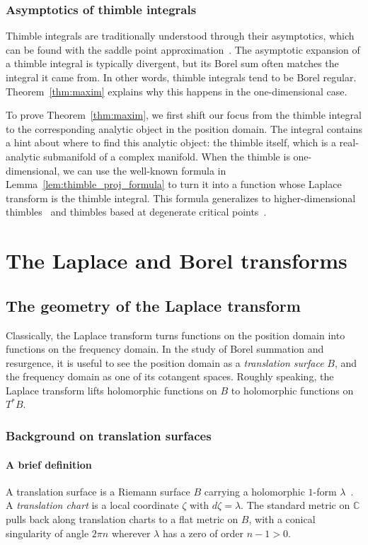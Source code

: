 \documentclass{article}
\newcommand{\C}{\mathbb{C}}
\theoremstyle{definition}
\theoremstyle{plain}
\begin{document}
\subsubsection{Asymptotics of thimble integrals}
%
Thimble integrals are traditionally understood through their asymptotics, which can be found with the saddle point approximation~\cite{andersen2020resurgence,delabaere-howls,delabaere_dillinger_pham,Delabaere-Pham99,dingle1973asymptotic,Malgrange22,Pham83}. The asymptotic expansion of a thimble integral is typically divergent, but its Borel sum often matches the integral it came from. In other words, thimble integrals tend to be Borel regular. Theorem~\ref{thm:maxim} explains why this happens in the one-dimensional case.

To prove Theorem~\ref{thm:maxim}, we first shift our focus from the thimble integral to the corresponding analytic object in the position domain. The integral contains a hint about where to find this analytic object: the thimble itself, which is a real-analytic submanifold of a complex manifold. When the thimble is one-dimensional, we can use the well-known formula in Lemma~\ref{lem:thimble_proj_formula} to turn it into a function whose Laplace transform is the thimble integral. This formula generalizes to higher-dimensional thimbles~\cite{pham} and thimbles based at degenerate critical points~\cite[Section 1.2.2]{mistegard_phdthesis}.
%
\section{The Laplace and Borel transforms}\label{sec:Laplace-Borel-general}
\subsection{The geometry of the Laplace transform}\label{sec:geometry_laplace}
Classically, the Laplace transform turns functions on the position domain into functions on the frequency domain. In the study of Borel summation and resurgence, it is useful to see the position domain as a {\em translation surface} $B$, and the frequency domain as one of its cotangent spaces. Roughly speaking, the Laplace transform lifts holomorphic functions on $B$ to holomorphic functions on $T^*B$.
%
\subsubsection{Background on translation surfaces}\label{sec:transl}
%
\paragraph{A brief definition}
%
A translation surface is a Riemann surface $B$ carrying a holomorphic $1$-form $\lambda$~\cite{zorich2006flat}. A {\em translation chart} is a local coordinate $\zeta$ with $d\zeta = \lambda$. The standard metric on $\C$ pulls back along translation charts to a flat metric on $B$, with a conical singularity of angle $2\pi n$ wherever $\lambda$ has a zero of order $n-1 > 0$.
\end{document}
